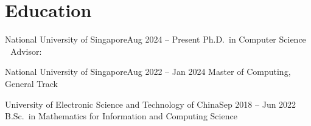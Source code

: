\section{Education}

\cvBlockStart

  \item
  \cvHeading
    {National University of Singapore}{Aug 2024 -- Present}
    {Ph.D.\ in Computer Science \,\textperiodcentered\, Advisor: }{}

  \item
  \cvHeading
    {National University of Singapore}{Aug 2022 -- Jan 2024}
    {Master of Computing, General Track}{}

  \item
  \cvHeading
    {University of Electronic Science and Technology of China}{Sep 2018 -- Jun 2022}
    {B.Sc.\ in Mathematics for Information and Computing Science}{}

\cvBlockEnd
